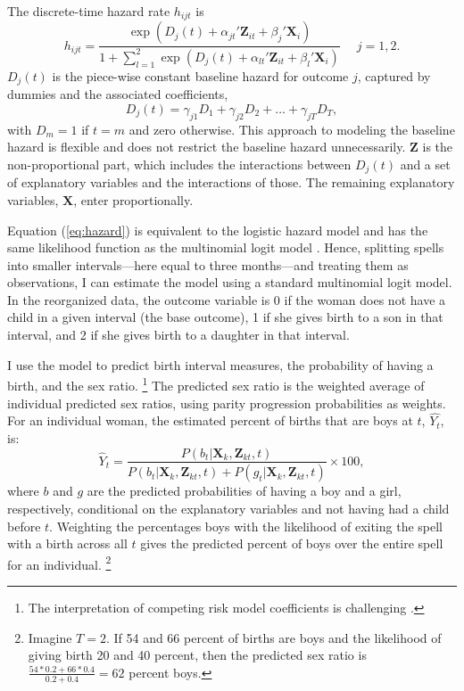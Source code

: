 \documentclass[12pt,letterpaper]{article}
\begin{document}
The discrete-time hazard rate $h_{ijt}$ is 
\begin{equation}
 h_{ijt} = \frac{\exp(D_j(t) + \alpha_{jt}'\mathbf{Z}_{it} + \beta_j'\mathbf{X}_{i})} 
 {1 + \sum_{l=1}^2 \exp(D_j(t) + \alpha_{lt}'\mathbf{Z}_{it} + \beta_l'\mathbf{X}_{i})} \: \: \; \; \;  j = 1,2.
 \label{eq:hazard}
\end{equation}
$D_{j}(t)$ is the piece-wise constant baseline hazard for outcome $j$, captured
by dummies and the associated coefficients,
\begin{equation}
D_j(t) = \gamma_{j1} D_1 + \gamma_{j2} D_2 + \ldots + \gamma_{jT} D_T,
\end{equation}
with $D_m = 1$ if $t=m$ and zero otherwise.
This approach to modeling the baseline hazard is flexible and does not restrict the 
baseline hazard unnecessarily.
$\mathbf{Z}$ is the non-proportional part, which includes the interactions between 
$D_j(t)$ and a set of explanatory variables and the interactions of those.
The remaining explanatory variables, $\mathbf{X}$, enter proportionally.




Equation (\ref{eq:hazard}) is equivalent to the logistic hazard model and has the same 
likelihood function as the multinomial logit model \citep{allison82,jenkins95}.
Hence, splitting spells into smaller intervals---here equal to three months---and 
treating them as observations, I can estimate the model using a standard multinomial 
logit model. 
In the reorganized data, the outcome variable is 0 if the woman does not have a child 
in a given interval (the base outcome), 1 if she gives birth to a son in that interval, 
and 2 if she gives birth to a daughter in that interval.

I use the model to predict birth interval measures, the probability of having a birth, 
and the sex ratio.%
\footnote{
The interpretation of competing risk model coefficients is challenging \citep{thomas96}.
}
The predicted sex ratio is the weighted average of individual predicted sex ratios, using 
parity progression probabilities as weights.
For an individual woman, the estimated percent of births that are boys at $t$, $\hat{Y_t}$, is:  
\begin{equation}
\hat{Y}_t 
= 
\frac{ P(b_{t} | \mathbf{X}_{k}, \mathbf{Z}_{kt},t )}
{ P(b_{t} | \mathbf{X}_{k}, \mathbf{Z}_{kt},t) + P(g_{t} | \mathbf{X}_{k}, \mathbf{Z}_{kt},t )} 
\times 100,
\label{eq:probability_son}
\end{equation}
where $b$ and $g$ are the predicted probabilities of having a boy and a girl, respectively,
conditional on the explanatory variables and not having had a child before $t$.
Weighting the percentages boys with the likelihood of exiting the spell with a birth across all 
$t$ gives the predicted percent of boys over the entire spell for an individual.%
\footnote{
Imagine $T=2$. 
If 54 and 66 percent of births are boys and the likelihood of giving birth 20 and 40 percent, 
then the predicted sex ratio is $\frac{54*0.2+66*0.4}{0.2+0.4} = 62$ percent boys. 
}
\end{document}
